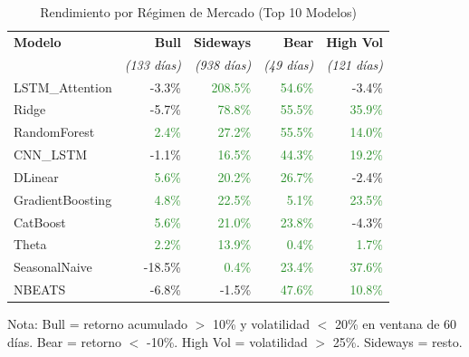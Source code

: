 \begin{table}[htbp]
\centering
\caption{Rendimiento por R\'egimen de Mercado (Top 10 Modelos)}
\label{tab:regime_performance}
\small
\begin{tabular}{@{}lrrrr@{}}
\toprule
\textbf{Modelo} & \textbf{Bull} & \textbf{Sideways} & \textbf{Bear} & \textbf{High Vol} \\
 & \textit{(133 d\'ias)} & \textit{(938 d\'ias)} & \textit{(49 d\'ias)} & \textit{(121 d\'ias)} \\
\midrule
LSTM\_Attention & \textcolor{BrickRed}{-3.3\%} & \textcolor{ForestGreen}{208.5\%} & \textcolor{ForestGreen}{54.6\%} & \textcolor{BrickRed}{-3.4\%} \\
Ridge & \textcolor{BrickRed}{-5.7\%} & \textcolor{ForestGreen}{78.8\%} & \textcolor{ForestGreen}{55.5\%} & \textcolor{ForestGreen}{35.9\%} \\
RandomForest & \textcolor{ForestGreen}{2.4\%} & \textcolor{ForestGreen}{27.2\%} & \textcolor{ForestGreen}{55.5\%} & \textcolor{ForestGreen}{14.0\%} \\
CNN\_LSTM & \textcolor{BrickRed}{-1.1\%} & \textcolor{ForestGreen}{16.5\%} & \textcolor{ForestGreen}{44.3\%} & \textcolor{ForestGreen}{19.2\%} \\
DLinear & \textcolor{ForestGreen}{5.6\%} & \textcolor{ForestGreen}{20.2\%} & \textcolor{ForestGreen}{26.7\%} & \textcolor{BrickRed}{-2.4\%} \\
GradientBoosting & \textcolor{ForestGreen}{4.8\%} & \textcolor{ForestGreen}{22.5\%} & \textcolor{ForestGreen}{5.1\%} & \textcolor{ForestGreen}{23.5\%} \\
CatBoost & \textcolor{ForestGreen}{5.6\%} & \textcolor{ForestGreen}{21.0\%} & \textcolor{ForestGreen}{23.8\%} & \textcolor{BrickRed}{-4.3\%} \\
Theta & \textcolor{ForestGreen}{2.2\%} & \textcolor{ForestGreen}{13.9\%} & \textcolor{ForestGreen}{0.4\%} & \textcolor{ForestGreen}{1.7\%} \\
SeasonalNaive & \textcolor{BrickRed}{-18.5\%} & \textcolor{ForestGreen}{0.4\%} & \textcolor{ForestGreen}{23.4\%} & \textcolor{ForestGreen}{37.6\%} \\
NBEATS & \textcolor{BrickRed}{-6.8\%} & \textcolor{BrickRed}{-1.5\%} & \textcolor{ForestGreen}{47.6\%} & \textcolor{ForestGreen}{10.8\%} \\
\bottomrule
\end{tabular}
\begin{tablenotes}
\small
\item Nota: Bull = retorno acumulado $>$ 10\% y volatilidad $<$ 20\% en ventana de 60 d\'ias. Bear = retorno $<$ -10\%. High Vol = volatilidad $>$ 25\%. Sideways = resto.
\end{tablenotes}
\end{table}
